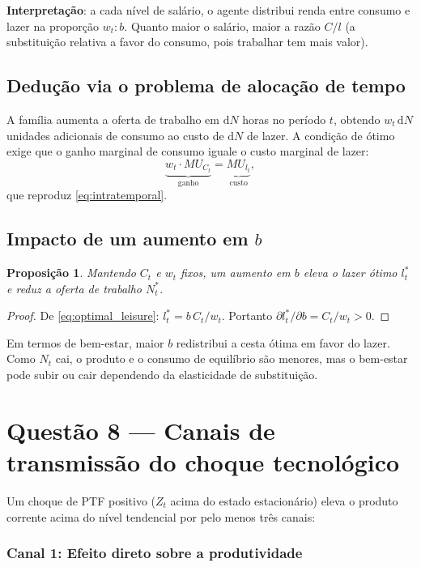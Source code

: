 \documentclass[11pt,a4paper]{article}
\newtheorem{theorem}{Proposição}
\newcommand{\dd}{\mathrm{d}}
\begin{document}
\textbf{Interpretação}: a cada nível de salário, o agente distribui renda entre
consumo e lazer na proporção $w_t : b$. Quanto maior o salário, maior a razão
$C/l$ (a substituição relativa a favor do consumo, pois trabalhar tem mais valor).

\subsection{Dedução via o problema de alocação de tempo}

A família aumenta a oferta de trabalho em $\dd N$ horas no período $t$,
obtendo $w_t\,\dd N$ unidades adicionais de consumo ao custo de $\dd N$ de lazer.
A condição de ótimo exige que o ganho marginal de consumo iguale o custo
marginal de lazer:
\[
  \underbrace{w_t \cdot MU_{C_t}}_{\text{ganho}} = \underbrace{MU_{l_t}}_{\text{custo}},
\]
que reproduz \eqref{eq:intratemporal}.

\subsection{Impacto de um aumento em $b$}

\begin{theorem}
  Mantendo $C_t$ e $w_t$ fixos, um aumento em $b$ eleva o lazer ótimo $l_t^*$
  e reduz a oferta de trabalho $N_t^*$.
\end{theorem}
\begin{proof}
  De \eqref{eq:optimal_leisure}: $l_t^* = b\,C_t/w_t$.
  Portanto $\partial l_t^*/\partial b = C_t/w_t > 0$.
\end{proof}

\noindent Em termos de bem-estar, maior $b$ redistribui a cesta ótima em favor
do lazer. Como $N_t$ cai, o produto e o consumo de equilíbrio são menores,
mas o bem-estar pode subir ou cair dependendo da elasticidade de substituição.

\section{Questão 8 --- Canais de transmissão do choque tecnológico}

Um choque de PTF positivo ($Z_t$ acima do estado estacionário) eleva o produto
corrente acima do nível tendencial por pelo menos três canais:

\subsubsection*{Canal 1: Efeito direto sobre a produtividade}
\end{document}
